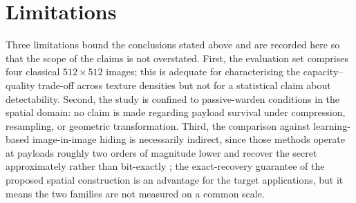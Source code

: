 \section{Limitations}
Three limitations bound the conclusions stated above and are recorded here so that the scope of the claims is not overstated. First, the evaluation set comprises four classical $512 \times 512$ images; this is adequate for characterising the capacity--quality trade-off across texture densities but not for a statistical claim about detectability. Second, the study is confined to passive-warden conditions in the spatial domain: no claim is made regarding payload survival under compression, resampling, or geometric transformation. Third, the comparison against learning-based image-in-image hiding is necessarily indirect, since those methods operate at payloads roughly two orders of magnitude lower and recover the secret approximately rather than bit-exactly \citep{janok2026survey}; the exact-recovery guarantee of the proposed spatial construction is an advantage for the target applications, but it means the two families are not measured on a common scale.
